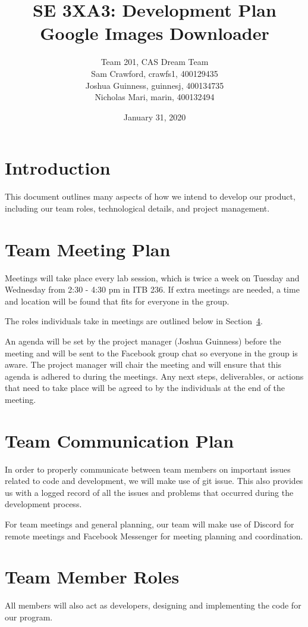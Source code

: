 \documentclass{article}
\title{SE 3XA3: Development Plan\\Google Images Downloader}
\author{Team 201, CAS Dream Team
		\\ Sam Crawford, crawfs1, 400129435
		\\ Joshua Guinness, guinnesj, 400134735
		\\ Nicholas Mari, marin, 400132494
}
\date{January 31, 2020}
\begin{document}
\maketitle

\tableofcontents

\newpage

\section{Introduction}
This document outlines many aspects of how we intend to develop our product, 
including our team roles, technological details, and project management.

\section{Team Meeting Plan}
Meetings will take place every lab session, which is twice a week on Tuesday and 
Wednesday from 2:30 - 4:30 pm in ITB 236. If extra meetings are needed, a time 
and location will be found that fits for everyone in the group.

The roles individuals take in meetings are outlined below in Section~\ref{roles}. 

An agenda will be set by the project manager (Joshua Guinness) before the 
meeting and will be sent to the Facebook group chat so everyone in the group is 
aware. The project manager will chair the meeting and will ensure that this 
agenda is adhered to during the meetings. Any next steps, deliverables, or actions 
that need to take place will be agreed to by the individuals at the end of the meeting. 

\section{Team Communication Plan}
In order to properly communicate between team members on important issues 
related to code and development, we will make use of git issue. This also provides
us with a logged record of all the 
issues and problems that occurred during the development process.

For team meetings and general planning, our team will make use of Discord for 
remote meetings and Facebook Messenger for meeting planning and coordination.

\section{Team Member Roles}
\label{roles}
All members will also act as developers, designing and implementing the code for 
our program.
\end{document}
